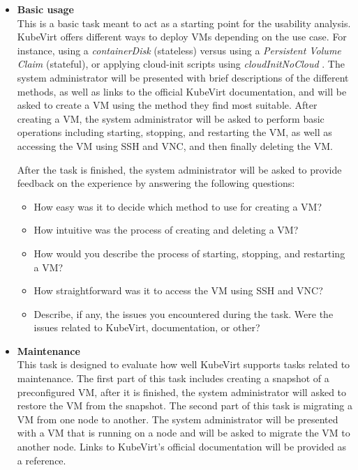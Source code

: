 \documentclass{article}
\begin{document}
\begin{itemize}
    \item\textbf{Basic usage}\\
    This is a basic task meant to act as a starting point for the usability analysis. KubeVirt offers different ways to deploy VMs depending on the use case. For instance, using a \textit{containerDisk} (stateless) versus using a \textit{Persistent Volume Claim} (stateful), or applying cloud-init scripts using \textit{cloudInitNoCloud} \cite{kubevirt-docs-disks}. The system administrator will be presented with brief descriptions of the different methods, as well as links to the official KubeVirt documentation, and will be asked to create a VM using the method they find most suitable. After creating a VM, the system administrator will be asked to perform basic operations including starting, stopping, and restarting the VM, as well as accessing the VM using SSH and VNC, and then finally deleting the VM.

    After the task is finished, the system administrator will be asked to provide feedback on the experience by answering the following questions:
    \begin{itemize}
        \item How easy was it to decide which method to use for creating a VM?
        \item How intuitive was the process of creating and deleting a VM?
        \item How would you describe the process of starting, stopping, and restarting a VM?
        \item How straightforward was it to access the VM using SSH and VNC?
        \item Describe, if any, the issues you encountered during the task. Were the issues related to KubeVirt, documentation, or other?
    \end{itemize}

    \item\textbf{Maintenance}\\
    This task is designed to evaluate how well KubeVirt supports tasks related to maintenance. The first part of this task includes creating a snapshot of a preconfigured VM, after it is finished, the system administrator will asked to restore the VM from the snapshot. The second part of this task is migrating a VM from one node to another. The system administrator will be presented with a VM that is running on a node and will be asked to migrate the VM to another node. Links to KubeVirt's official documentation will be provided as a reference.


\end{itemize}
\end{document}
